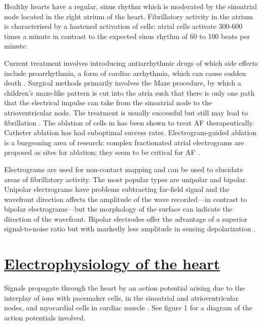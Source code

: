 \documentclass[twocolumn]{article}
\begin{document}
Healthy hearts have a regular, sinus  rhythm which is moderated by the sinoatrial node located in the right atrium of the heart. Fibrillatory activity in the atrium is characterised by a hastened activation of cells: atrial cells activate 300-600 times a minute in contrast to the expected sinus rhythm of 60 to 100 beats per minute.%

Current treatment involves introducing antiarrhythmic drugs of which side effects include proarrhythmia, a form of cardiac arrhythmia, which can cause sudden death \cite{Nattel1}. Surgical methods primarily involves the Maze procedure, by which a children's maze-like pattern is cut into the atria such that there is only one path that the electrical impulse can take from the sinoatrial node to the atrioventricular node. The treatment is usually successful but still may lead to fibrillation \cite{Tsui}. The ablation of cells in has been shown to treat AF therapeutically. Catheter ablation has had suboptimal success rates. Electrogram-guided ablation is a burgeoning area of research: complex fractionated atrial electrograms are proposed as sites for ablation; they seem to be critical for AF \cite{Greek}. %

Electrograms are used for non-contact mapping and can be used to elucidate areas of fibrillatory activity. The most popular types are unipolar and bipolar. Unipolar electrograms have problems subtracting far-field signal and the wavefront direction affects the amplitude of the wave recorded---in contrast to bipolar electrograms---but the morphology of the surface can indicate the direction of the wavefront. Bipolar electrodes offer the advantage of a superior signal-to-noise ratio but with markedly less amplitude in sensing depolarization \cite{Vincent}. 


\section{\textbf{\underline{Electrophysiology of the heart}}}

Signals propagate through the heart by an action potential arising due to the interplay of ions with pacemaker cells, in the sinoatrial and atrioventricular nodes, and myocardial cells in cardiac muscle \cite{Augustus}. See figure 1 for a diagram of the action potentials involved.
\end{document}
